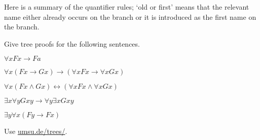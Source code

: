 Here is a summary of the quantifier rules; `old or first' means that the
relevant name either already occurs on the branch or it is introduced as the
first name on the branch.

\bigskip

\begin{minipage}{0.24\textwidth} \centering
{}
\end{minipage}
\begin{minipage}{0.24\textwidth}\centering
{}
\end{minipage}
\begin{minipage}{0.24\textwidth}\centering
{}
\end{minipage}
\begin{minipage}{0.24\textwidth} \centering
{}
\end{minipage}

\medskip

\begin{exercise}
  Give tree proofs for the following sentences.
  \begin{exlist}
  \item $\forall x Fx \to Fa$
  \item $\forall x (Fx \to Gx) \to (\forall x Fx \to \forall x Gx)$
  \item $\forall x (Fx \land Gx) \leftrightarrow (\forall x Fx \land \forall x Gx)$
  \item $\exists x\forall y Gxy \to \forall y \exists x Gxy$
  \item $\exists y \forall x(Fy \to Fx)$
  \end{exlist}
\end{exercise}
\begin{solution}
  Use \href{https://www.umsu.de/trees/}{umsu.de/trees/}.
\end{solution}

